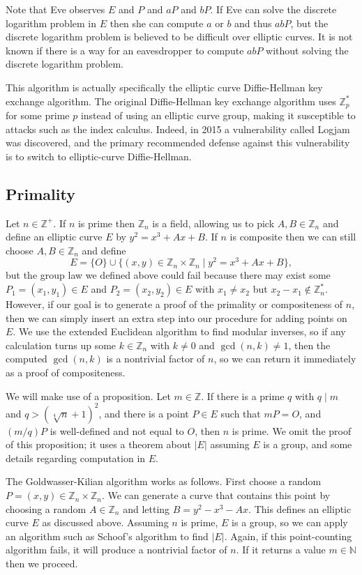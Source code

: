 \documentclass[12pt]{article}
\newcommand*\N{\mathbb{N}}
\newcommand*\Z{\mathbb{Z}}
\newcommand*\card[2][]{#1\lvert #2 #1\rvert}
\newcommand*\cross{\times}
\newcommand*\divides{\mid}
\newcommand*\set[3][]{#1\{ #2 \suchthat[#1] #3 #1\}}
\newcommand*\suchthat[1][]{\mathrel{#1|}}
\newcommand*\union{\cup}
\begin{document}
Note that Eve observes $E$ and $P$ and $aP$ and $bP$. If Eve can solve the
discrete logarithm problem in $E$ then she can compute $a$ or $b$ and thus
$abP$, but the discrete logarithm problem is believed to be difficult over
elliptic curves. It is not known if there is a way for an eavesdropper to
compute $abP$ without solving the discrete logarithm problem.\cite{book}

This algorithm is actually specifically the elliptic curve Diffie-Hellman key
exchange algorithm. The original Diffie-Hellman key exchange algorithm uses
$\Z_p^*$ for some prime $p$ instead of using an elliptic curve group, making it
susceptible to attacks such as the index calculus. Indeed, in 2015 a
vulnerability called Logjam was discovered, and the primary recommended defense
against this vulnerability is to switch to elliptic-curve
Diffie-Hellman.\cite{logjam}

\subsection{Primality}

Let $n \in \Z^+$. If $n$ is prime then $\Z_n$ is a field, allowing us to pick
$A, B \in \Z_n$ and define an elliptic curve $E$ by $y^2 = x^3 + Ax + B$. If $n$
is composite then we can still choose $A, B \in \Z_n$ and define
\[ E = \{O\} \union \set{(x, y) \in \Z_n \cross \Z_n}{y^2 = x^3 + Ax + B}, \]
but the group law we defined above could fail because there may exist some $P_1
= (x_1, y_1) \in E$ and $P_2 = (x_2, y_2) \in E$ with $x_1 \neq x_2$ but $x_2 -
x_1 \notin \Z_n^*$. However, if our goal is to generate a proof of the primality
or compositeness of $n$, then we can simply insert an extra step into our
procedure for adding points on $E$. We use the extended Euclidean algorithm to
find modular inverses, so if any calculation turns up some $k \in \Z_n$ with $k
\neq 0$ and $\gcd(n, k) \neq 1$, then the computed $\gcd(n, k)$ is a nontrivial
factor of $n$, so we can return it immediately as a proof of compositeness.

We will make use of a proposition. Let $m \in \Z$. If there is a prime $q$ with
$q \divides m$ and $q > (\sqrt[4]{n} + 1)^2$, and there is a point $P \in E$
such that $mP = O$, and $(m/q)P$ is well-defined and not equal to $O$, then $n$
is prime. We omit the proof of this proposition; it uses a theorem about
$\card{E}$ assuming $E$ is a group, and some details regarding computation in
$E$.\cite{book}

The Goldwasser-Kilian algorithm works as follows.\cite{book} First choose a
random $P = (x, y) \in \Z_n \cross \Z_n$. We can generate a curve that contains
this point by choosing a random $A \in \Z_n$ and letting $B = y^2 - x^3 - Ax$.
This defines an elliptic curve $E$ as discussed above. Assuming $n$ is prime,
$E$ is a group, so we can apply an algorithm such as Schoof's algorithm to find
$\card{E}$.\cite{book} Again, if this point-counting algorithm fails, it will
produce a nontrivial factor of $n$. If it returns a value $m \in \N$ then we
proceed.
\end{document}
